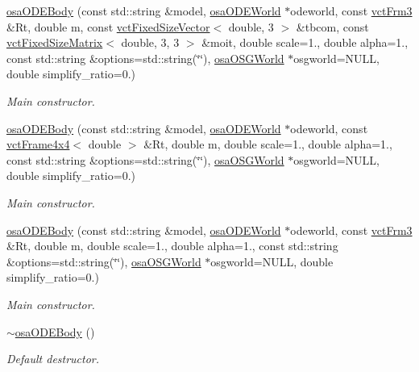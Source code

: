 \begin{DoxyCompactItemize}
\hyperlink{classosa_o_d_e_body_a4940c7dc8046e116cb6eaaba4326939c}{osa\-O\-D\-E\-Body} (const std\-::string \&model, \hyperlink{classosa_o_d_e_world}{osa\-O\-D\-E\-World} $\ast$odeworld, const \hyperlink{vct_transformation_types_8h_a81feda0a02c2d1bc26e5553f409fed20}{vct\-Frm3} \&Rt, double m, const \hyperlink{classvct_fixed_size_vector}{vct\-Fixed\-Size\-Vector}$<$ double, 3 $>$ \&tbcom, const \hyperlink{classvct_fixed_size_matrix}{vct\-Fixed\-Size\-Matrix}$<$ double, 3, 3 $>$ \&moit, double scale=1., double alpha=1., const std\-::string \&options=std\-::string(\char`\"{}\char`\"{}), \hyperlink{classosa_o_s_g_world}{osa\-O\-S\-G\-World} $\ast$osgworld=N\-U\-L\-L, double simplify\-\_\-ratio=0.)
\begin{DoxyCompactList}\small\item\em Main constructor. \end{DoxyCompactList}\item 
\hyperlink{classosa_o_d_e_body_acc663ffd208f665a6a84376cac5c1428}{osa\-O\-D\-E\-Body} (const std\-::string \&model, \hyperlink{classosa_o_d_e_world}{osa\-O\-D\-E\-World} $\ast$odeworld, const \hyperlink{classvct_frame4x4}{vct\-Frame4x4}$<$ double $>$ \&Rt, double m, double scale=1., double alpha=1., const std\-::string \&options=std\-::string(\char`\"{}\char`\"{}), \hyperlink{classosa_o_s_g_world}{osa\-O\-S\-G\-World} $\ast$osgworld=N\-U\-L\-L, double simplify\-\_\-ratio=0.)
\begin{DoxyCompactList}\small\item\em Main constructor. \end{DoxyCompactList}\item 
\hyperlink{classosa_o_d_e_body_a1c5ea3faee0f0fce9851e10c0c58cc55}{osa\-O\-D\-E\-Body} (const std\-::string \&model, \hyperlink{classosa_o_d_e_world}{osa\-O\-D\-E\-World} $\ast$odeworld, const \hyperlink{vct_transformation_types_8h_a81feda0a02c2d1bc26e5553f409fed20}{vct\-Frm3} \&Rt, double m, double scale=1., double alpha=1., const std\-::string \&options=std\-::string(\char`\"{}\char`\"{}), \hyperlink{classosa_o_s_g_world}{osa\-O\-S\-G\-World} $\ast$osgworld=N\-U\-L\-L, double simplify\-\_\-ratio=0.)
\begin{DoxyCompactList}\small\item\em Main constructor. \end{DoxyCompactList}\item 
\hyperlink{classosa_o_d_e_body_a05a97daa4ba1c3ac548b679568941930}{$\sim$osa\-O\-D\-E\-Body} ()
\begin{DoxyCompactList}\small\item\em Default destructor. \end{DoxyCompactList}\item 

\end{DoxyCompactItemize}
